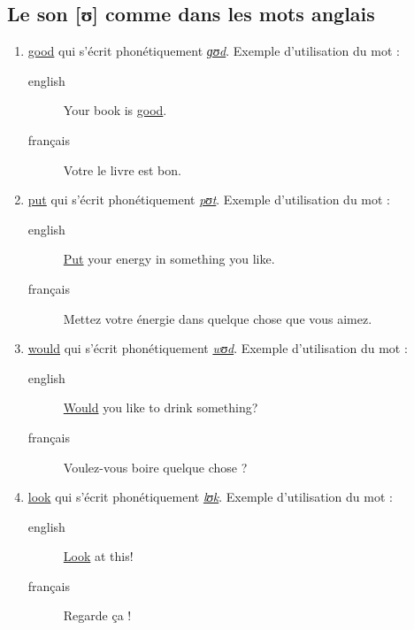 \documentclass[12pt,a4paper]{book}
\begin{document}
\subsection{Le son [ʊ] comme dans les mots anglais}
\label{sec:org2ccc235}
\begin{enumerate}
\item \href{http://www.wordreference.com/enfr/good}{good} qui s'écrit phonétiquement \href{https://en.oxforddictionaries.com/definition/good}{\emph{ɡʊd}}. Exemple d'utilisation du mot :
\begin{description}
\item[{english}] \textenglish{Your book is \href{https://youtu.be/o3TQSaqHBtM}{good}.}
\item[{français}] Votre le livre est bon.
\end{description}
\item \href{http://www.wordreference.com/enfr/put}{put} qui s'écrit phonétiquement \href{https://en.oxforddictionaries.com/definition/put}{\emph{pʊt}}. Exemple d'utilisation du mot :
\begin{description}
\item[{english}] \textenglish{\href{https://youtu.be/BSpoa7TsiD0}{Put} your energy in something you like.}
\item[{français}] Mettez votre énergie dans quelque chose que vous
aimez.
\end{description}
\item \href{http://www.wordreference.com/enfr/would}{would} qui s'écrit phonétiquement \href{https://en.oxforddictionaries.com/definition/would}{\emph{wʊd}}. Exemple d'utilisation du mot :
\begin{description}
\item[{english}] \textenglish{\href{https://youtu.be/wRSNm3pr100}{Would} you like to drink something?}
\item[{français}] Voulez-vous boire quelque chose ?
\end{description}
\item \href{http://www.wordreference.com/enfr/look}{look} qui s'écrit phonétiquement \href{https://en.oxforddictionaries.com/definition/look}{\emph{lʊk}}. Exemple d'utilisation du mot :
\begin{description}
\item[{english}] \textenglish{\href{https://youtu.be/b4xcpMCPhfE}{Look} at this!}
\item[{français}] Regarde ça !
\end{description}
\end{enumerate}
\end{document}
